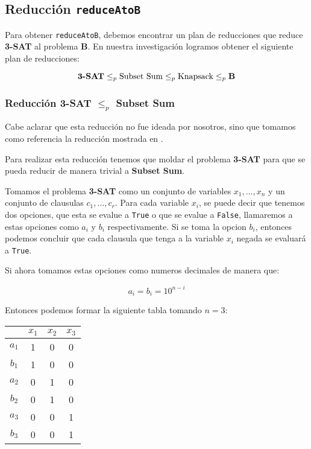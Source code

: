 \setcounter{subsection}{3}
\subsection{Reducci\'on \texttt{reduceAtoB}}
 
Para obtener \texttt{reduceAtoB}, debemos encontrar un plan de reducciones 
que reduce \textbf{3-SAT} al problema \textbf{B}. 
En nuestra investigaci\'on logramos obtener el siguiente plan de reducciones:

\[
  \textbf{3-SAT} \le_{p}
  \textnormal{Subset Sum} \le_{p}
  \textnormal{Knapsack} \le_{p} 
  \textbf{B}
\]

\subsubsection*{Reducci\'on 3-SAT $\le_{p}$ Subset Sum}

Cabe aclarar que esta reducci\'on no fue ideada por nosotros, sino que tomamos 
como referencia la reducci\'on mostrada en \cite{pcmi2007lectureB07}.

Para realizar esta reducci\'on tenemos que moldar el problema \textbf{3-SAT} para 
que se pueda reducir de manera trivial a \textbf{Subset Sum}.

Tomamos el problema \textbf{3-SAT} como un conjunto de variables $x_1, ..., x_n$
y un conjunto de clausulas $c_1, ..., c_r$. 
Para cada variable $x_i$, se puede decir que tenemos dos opciones, que esta se 
evalue a \texttt{True} o que se evalue a \texttt{False}, llamaremos a estas 
opciones como $a_i$ y $b_i$ respectivamente. 
Si se toma la opcion $b_i$, entonces podemos concluir que cada clausula que 
tenga a la variable $x_i$ negada se evaluar\'a a \texttt{True}. 

Si ahora tomamos estas opciones como numeros decimales de manera que: 

\[
  a_i = b_i = 10^{n-i}
\]

Entonces podemos formar la siguiente tabla tomando $n=3$: 

\begin{center}
\begin{tabular}{ c|c c c }
  & $x_1$ & $x_2$ & $x_3$ \\
  \hline 
  $a_1$ & 1 & 0 & 0 \\
  $b_1$ & 1 & 0 & 0 \\
  $a_2$ & 0 & 1 & 0 \\
  $b_2$ & 0 & 1 & 0 \\
  $a_3$ & 0 & 0 & 1 \\
  $b_3$ & 0 & 0 & 1 \\
\end{tabular} 
\end{center}

